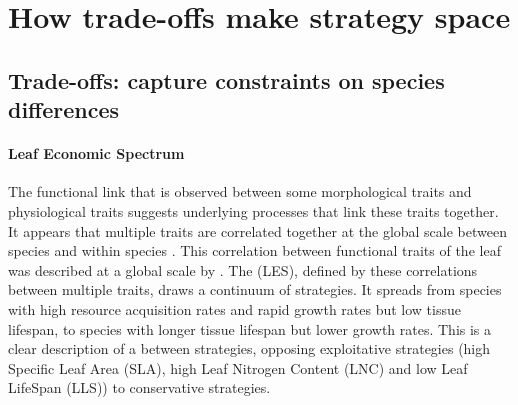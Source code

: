 



\section{How trade-offs make strategy space}

\subsection{Trade-offs: capture constraints on species differences}

\paragraph{Leaf Economic Spectrum}
The functional link that is observed between some morphological traits and physiological traits suggests underlying processes that link these traits together. It appears that multiple traits are correlated together at the global scale between species \parencite{reich_evolution_2003,     wright_worldwide_2004, chave_towards_2009, reich_world-wide_2014} and within species \parencite{hu_novel_2015}. This correlation between functional traits of the leaf was described at a global scale by \citet{wright_worldwide_2004}. The  (LES), defined by these correlations between multiple traits, draws a continuum of strategies. It spreads from species with high resource acquisition rates and rapid growth rates but low tissue lifespan, to species with longer tissue lifespan but lower growth rates. This is a clear description of a  between strategies, opposing exploitative strategies (high Specific Leaf Area (SLA), high Leaf Nitrogen Content (LNC) and low Leaf LifeSpan (LLS)) to conservative strategies.


